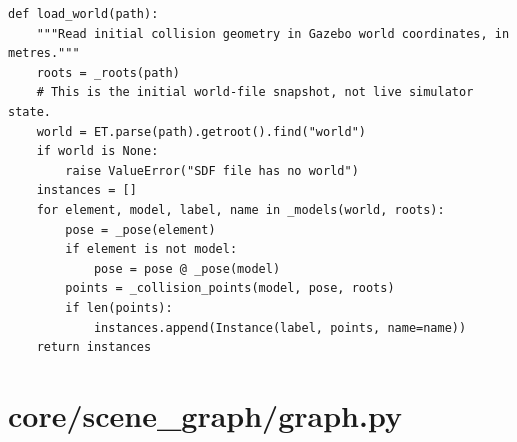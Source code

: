 \documentclass[11pt,a4paper]{book}
\begin{document}
\begin{lstlisting}
def load_world(path):
    """Read initial collision geometry in Gazebo world coordinates, in metres."""
    roots = _roots(path)
    # This is the initial world-file snapshot, not live simulator state.
    world = ET.parse(path).getroot().find("world")
    if world is None:
        raise ValueError("SDF file has no world")
    instances = []
    for element, model, label, name in _models(world, roots):
        pose = _pose(element)
        if element is not model:
            pose = pose @ _pose(model)
        points = _collision_points(model, pose, roots)
        if len(points):
            instances.append(Instance(label, points, name=name))
    return instances
\end{lstlisting}
\section{core/scene\_graph/graph.py}
\end{document}
